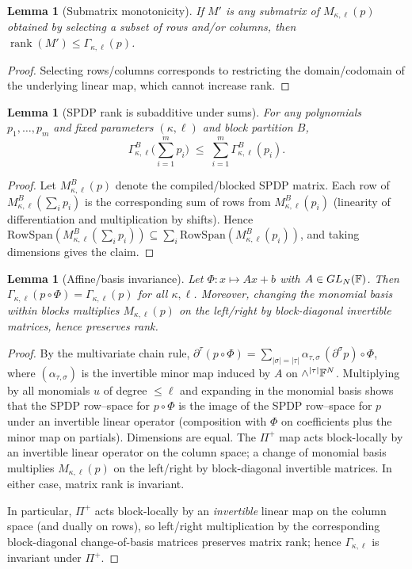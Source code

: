 \documentclass[12pt]{article}
\DeclareMathOperator{\rank}{rank}
\newtheorem{lemma}[theorem]{Lemma}
\theoremstyle{definition}
\theoremstyle{definition}
\theoremstyle{remark}
\theoremstyle{remark}
\begin{document}
\begin{lemma}[Submatrix monotonicity]
\label{lem:submatrix}
If $M'$ is any submatrix of $M_{\kappa,\ell}(p)$ obtained by selecting a subset of rows and/or columns, then $\rank(M')\le \Gamma_{\kappa,\ell}(p)$.
\end{lemma}
\begin{proof}
Selecting rows/columns corresponds to restricting the domain/codomain of the underlying linear map, which cannot increase rank.
\end{proof}


\begin{lemma}[SPDP rank is subadditive under sums]
\label{lem:rank-subadditivity-sum}
For any polynomials $p_1,\dots,p_m$ and fixed parameters $(\kappa,\ell)$ and block partition $B$,
\[
\Gamma^{B}_{\kappa,\ell}\!\Big(\sum_{i=1}^{m} p_i\Big)\;\le\;\sum_{i=1}^{m}\Gamma^{B}_{\kappa,\ell}(p_i).
\]
\end{lemma}

\begin{proof}
Let $M^{B}_{\kappa,\ell}(p)$ denote the compiled/blocked SPDP matrix.
Each row of $M^{B}_{\kappa,\ell}(\sum_i p_i)$ is the corresponding sum of rows from
$M^{B}_{\kappa,\ell}(p_i)$ (linearity of differentiation and multiplication by shifts).
Hence
$\mathrm{RowSpan}(M^{B}_{\kappa,\ell}(\sum_i p_i))\subseteq
\sum_i \mathrm{RowSpan}(M^{B}_{\kappa,\ell}(p_i))$,
and taking dimensions gives the claim.
\end{proof}

\begin{lemma}[Affine/basis invariance]
\label{lem:affine}
Let $\Phi:x\mapsto Ax+b$ with $A\in GL_N(\Bbb F)$. Then $\Gamma_{\kappa,\ell}(p\circ \Phi)=\Gamma_{\kappa,\ell}(p)$ for all $\kappa,\ell$.
Moreover, changing the monomial basis within blocks multiplies $M_{\kappa,\ell}(p)$ on the left/right by
block-diagonal invertible matrices, hence preserves rank.
\end{lemma}
\begin{proof}
By the multivariate chain rule, $\partial^\tau(p\circ\Phi)=\sum_{|\sigma|=|\tau|} \alpha_{\tau,\sigma} \,(\partial^\sigma p)\circ\Phi$,
where $(\alpha_{\tau,\sigma})$ is the invertible minor map induced by $A$ on $\wedge^{|\tau|}\Bbb F^N$.
Multiplying by all monomials $u$ of degree $\le \ell$ and expanding in the monomial basis shows that the SPDP row--space for $p\circ\Phi$
is the image of the SPDP row--space for $p$ under an invertible linear operator (composition with $\Phi$ on coefficients plus the minor map on partials). Dimensions are equal.
The $\Pi^+$ map acts block-locally by an invertible linear operator on the column space; a change of monomial basis multiplies $M_{\kappa,\ell}(p)$ on the left/right by block-diagonal invertible matrices. In either case, matrix rank is invariant.

In particular, $\Pi^+$ acts block-locally by an \emph{invertible} linear map on the column space (and dually on rows), so left/right multiplication by the corresponding block-diagonal change-of-basis matrices preserves matrix rank; hence $\Gamma_{\kappa,\ell}$ is invariant under $\Pi^+$.
\end{proof}
\end{document}
